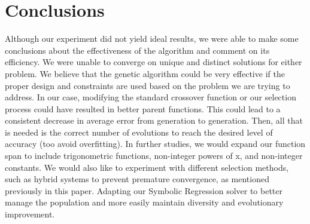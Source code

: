 
\section{Conclusions}
\label{sec:concl}

Although our experiment did not yield ideal results, we were able to make some conclusions about the effectiveness of the algorithm and comment on its efficiency. We were unable to converge on unique and distinct solutions for either problem. We believe that the genetic algorithm could be very effective if the proper design and constraints are used based on the problem we are trying to address. In our case, modifying the standard crossover function or our selection process could have resulted in better parent functions. This could lead to a consistent decrease in average error from generation to generation. Then, all that is needed is the correct number of evolutions to reach the desired level of accuracy (too avoid overfitting). In further studies, we would expand our function span to include trigonometric functions, non-integer powers of x, and non-integer constants. We would also like to experiment with different selection methods, such as hybrid systems to prevent premature convergence, as mentioned previously in this paper. Adapting our Symbolic Regression solver to better manage the population and more easily maintain diversity and evolutionary improvement. 